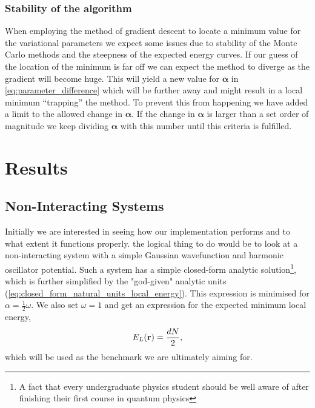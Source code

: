 \documentclass[
    a4paper, aps, twocolumn, floatfix, superscriptaddress,
    nofootinbib]{revtex4-1}
\newcommand{\vfg}{\boldsymbol}
\newcommand{\1}{\mathds{1}}
\begin{document}
            \subsubsection{Stability of the algorithm}
                When employing the method of gradient descent to locate a
                minimum value for the variational parameters we expect some
                issues due to stability of the Monte Carlo methods and the
                steepness of the expected energy curves. If our guess of the
                location of the minimum is far off we can expect the method to
                diverge as the gradient will become huge. This will yield a
                new value for $\vfg{\alpha}$ in
                \autoref{eq:parameter_difference} which will be further away and
                might result in a local minimum ``trapping'' the method. To
                prevent this from happening we have added a limit to the allowed
                change in $\vfg{\alpha}$. If the change in $\vfg{\alpha}$ is
                larger than a set order of magnitude we keep dividing
                $\vfg{\alpha}$ with this number until this criteria is
                fulfilled.

\section{Results}

    \subsection{Non-Interacting Systems}
        Initially we are interested in seeing how our implementation performs
        and to what extent it functions properly.  the logical thing to do would
        be to look at a non-interacting system with a simple Gaussian
        wavefunction and harmonic oscillator potential. Such a system has a
        simple closed-form analytic solution\footnote{A fact that every
        undergraduate physics student should be well aware of after finishing
        their first course in quantum physics}, which is further simplified by
        the "god-given" analytic units
        (\autoref{eq:closed_form_natural_units_local_energy}). This expression
        is minimised for $\alpha = \frac{1}{2}\omega$. We also set $\omega = 1$
        and get an expression for the expected minimum local energy,
        \begin{equation}
            E_L(\vb{r}) = \frac{dN}{2},
        \end{equation}
        which will be used as the benchmark we are ultimately aiming for.
\end{document}
